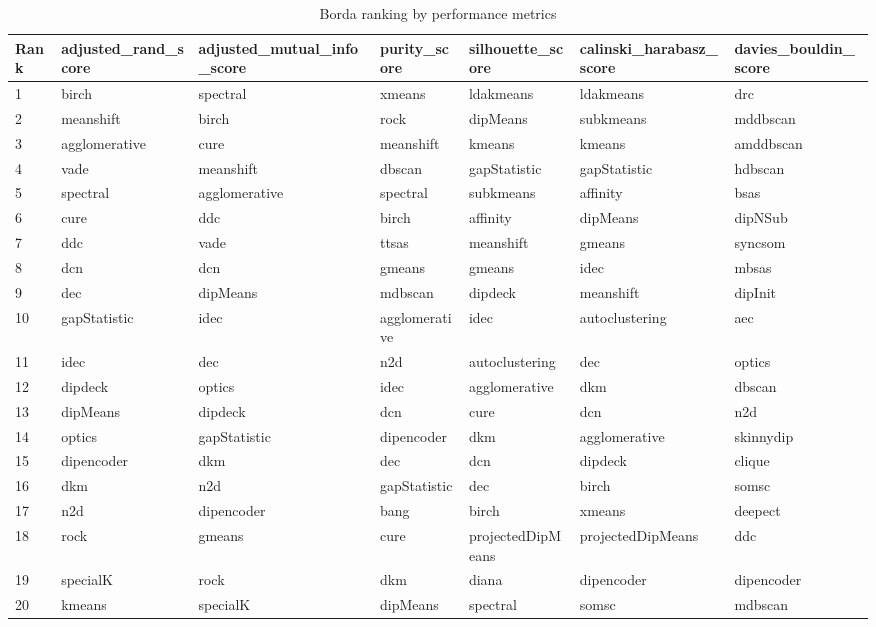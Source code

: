 \begin{table}[H]
\centering
\caption{Borda ranking by performance metrics}
\label{tab::borda}
\begin{tabular}{|l|l|l|l|l|l|l|}
\hline
Rank & adjusted\_rand\_score & adjusted\_mutual\_info\_score & purity\_score & silhouette\_score & calinski\_harabasz\_score & davies\_bouldin\_score \\
\hline
1 & birch & spectral & xmeans & ldakmeans & ldakmeans & drc \\
\hline
2 & meanshift & birch & rock & dipMeans & subkmeans & mddbscan \\
\hline
3 & agglomerative & cure & meanshift & kmeans & kmeans & amddbscan \\
\hline
4 & vade & meanshift & dbscan & gapStatistic & gapStatistic & hdbscan \\
\hline
5 & spectral & agglomerative & spectral & subkmeans & affinity & bsas \\
\hline
6 & cure & ddc & birch & affinity & dipMeans & dipNSub \\
\hline
7 & ddc & vade & ttsas & meanshift & gmeans & syncsom \\
\hline
8 & dcn & dcn & gmeans & gmeans & idec & mbsas \\
\hline
9 & dec & dipMeans & mdbscan & dipdeck & meanshift & dipInit \\
\hline
10 & gapStatistic & idec & agglomerative & idec & autoclustering & aec \\
\hline
11 & idec & dec & n2d & autoclustering & dec & optics \\
\hline
12 & dipdeck & optics & idec & agglomerative & dkm & dbscan \\
\hline
13 & dipMeans & dipdeck & dcn & cure & dcn & n2d \\
\hline
14 & optics & gapStatistic & dipencoder & dkm & agglomerative & skinnydip \\
\hline
15 & dipencoder & dkm & dec & dcn & dipdeck & clique \\
\hline
16 & dkm & n2d & gapStatistic & dec & birch & somsc \\
\hline
17 & n2d & dipencoder & bang & birch & xmeans & deepect \\
\hline
18 & rock & gmeans & cure & projectedDipMeans & projectedDipMeans & ddc \\
\hline
19 & specialK & rock & dkm & diana & dipencoder & dipencoder \\
\hline
20 & kmeans & specialK & dipMeans & spectral & somsc & mdbscan \\

\end{tabular}
\end{table}
